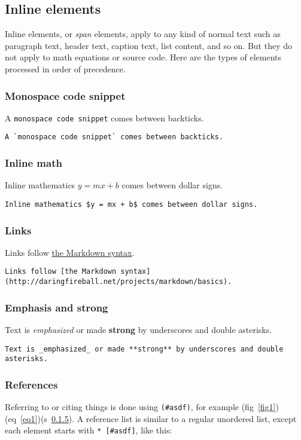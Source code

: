 \subsection{Inline elements}
\label{s2.4}
Inline elements, or \emph{span} elements, apply to any kind of normal text such as paragraph text, header text, caption text, list content, and so on. But they do not apply to math equations or source code. Here are the types of elements processed in order of precedence.

\subsubsection{Monospace code snippet}
\label{s2.4.1}
A \texttt{monospace code snippet} comes between backticks.

\begin{lstlisting}
A `monospace code snippet` comes between backticks.
\end{lstlisting}
\subsubsection{Inline math}
\label{s2.4.2}
Inline mathematics $y = mx + b$ comes between dollar signs.

\begin{lstlisting}
Inline mathematics $y = mx + b$ comes between dollar signs.
\end{lstlisting}
\subsubsection{Links}
\label{s2.4.3}
Links follow \href{http://daringfireball.net/projects/markdown/basics}{the Markdown syntax}.

\begin{lstlisting}
Links follow [the Markdown syntax](http://daringfireball.net/projects/markdown/basics).
\end{lstlisting}
\subsubsection{Emphasis and strong}
\label{s2.4.4}
Text is \emph{emphasized} or made \textbf{strong} by underscores and double asterisks.

\begin{lstlisting}
Text is _emphasized_ or made **strong** by underscores and double asterisks.
\end{lstlisting}
\subsubsection{References}
\label{s2.4.5}
Referring to or citing things is done using \texttt{(\#asdf)}, for example (fig~\ref{fig1})(eq~\ref{eq1})(s~\ref{s2.4.5})\cite{asdf}. A reference list is similar to a regular unordered list, except each element starts with  \texttt{* [\#asdf]}, like this:


